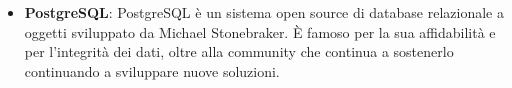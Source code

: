 \begin{itemize}
    \item \textbf{PostgreSQL}: PostgreSQL è un sistema open source di database relazionale 
    a oggetti sviluppato da Michael Stonebraker. È famoso per la sua affidabilità e per 
    l'integrità dei dati, oltre alla community che continua a sostenerlo continuando
    a sviluppare nuove soluzioni.
    \cite{PostgreSQL}
    
\end{itemize}